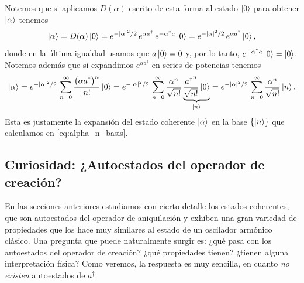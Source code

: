 \documentclass[10pt, a4paper]{article}
\numberwithin{equation}{subsection}
\begin{document}
Notemos que si aplicamos $D(\alpha)$ escrito de esta forma al estado $\ket{0}$
para obtener $\ket{\alpha}$ tenemos
\begin{equation}
  \ket{\alpha} = D(\alpha)\ket{0} = 
  e^{-\abs{\alpha}^2/2}\,e^{\alpha a^\dagger}\,e^{-{{\alpha}^{*}}a} \ket{0} =
  e^{-\abs{\alpha}^2/2}\,e^{\alpha a^\dagger} \ket{0},
\end{equation}
donde en la última igualdad usamos que $a\ket{0} = 0$ y, por lo tanto,
$e^{-{{\alpha}^{*}}a}\ket{0} = \ket{0}$. Notemos además que si expandimos
$e^{\alpha a^\dagger}$ en series de potencias tenemos
\begin{equation}
  \ket{\alpha} = 
  e^{-\abs{\alpha}^2/2}\,\sum_{n=0}^{\infty} \frac{\left(\alpha
  a^\dagger\right)^n}{n!} \ket{0} =
  e^{-\abs{\alpha}^2/2}\,\sum_{n=0}^{\infty} \frac{\alpha^n}{\sqrt{n!}}
  \underbrace{\frac{{a^\dagger}^n}{\sqrt{n!}} \ket{0}}_{\ket{n}} =
  e^{-\abs{\alpha}^2/2}\,\sum_{n=0}^{\infty} \frac{\alpha^n}{\sqrt{n!}}
  \ket{n}.
\end{equation}
Esta es justamente la expansión del estado coherente $\ket{\alpha}$ en la base
$\set{\ket{n}}$ que calculamos en \eqref{eq:alpha_n_basis}.

\bigbreak


\subsection{Curiosidad: ¿Autoestados del operador de creación?}

En las secciones anteriores estudiamos con cierto detalle los estados
coherentes, que son autoestados del operador de aniquilación y exhiben una gran
variedad de propiedades que los hace muy similares al estado de un oscilador
armónico clásico. Una pregunta que puede naturalmente surgir es: ¿qué pasa con
los autoestados del operador de creación? ¿qué propiedades tienen? ¿tienen
alguna interpretación física? Como veremos, la respuesta es muy sencilla, en
cuanto \emph{no existen} autoestados de $a^\dagger$.

\bigbreak
\end{document}
